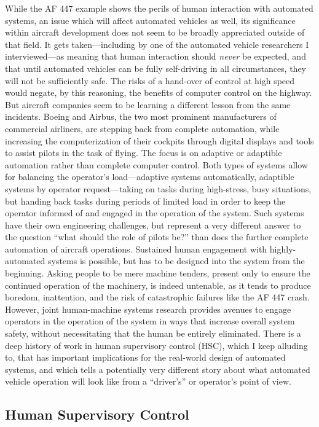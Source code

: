 While the AF 447 example shows the
perils of human interaction with automated systems, an issue which will
affect automated vehicles as well, its significance
within aircraft development does not seem to be broadly appreciated
outside of that field. It gets taken---including by one of the
automated vehicle researchers I interviewed---as meaning that human
interaction should \emph{never} be expected, and that until automated
vehicles can be fully self-driving in all circumstances, they will not
be sufficiently safe. The risks of a hand-over of control at high
speed would negate, by this reasoning, the benefits of computer
control on the highway. But aircraft companies seem to be learning a
different lesson from the same incidents. Boeing and Airbus, the two
most prominent manufacturers of commercial airliners, are stepping
back from complete automation, while increasing the computerization of
their cockpits through digital displays and tools to assist pilots in
the task of flying\cite{???}. The focus is on adaptive or adaptible automation
rather than complete computer control. Both types of systems allow for
balancing the operator's load---adaptive systems automatically,
adaptible systems by operator request---taking on tasks during
high-stress, busy situations, but handing back tasks during periods of
limited load in order to keep the operator informed of and engaged in
the operation of the system\cite{???}. Such systems have their own
engineering challenges, but represent a very different answer to the
question ``what should the role of pilots be?'' than does the further
complete automation of aircraft operations. Sustained human engagement
with highly-automated systems is possible, but has to be designed into
the system from the beginning. Asking people to be mere machine
tenders, present only to ensure the continued operation of the
machinery, is indeed untenable, as it tends to produce boredom,
inattention, and the risk of catastrophic failures like the AF 447
crash. However, joint human-machine systems research provides avenues
to engage operators in the operation of the system in ways that
increase overall system safety, without necessitating that the human
be entirely eliminated. There is a deep history of
work in human supervisory control (HSC), which I keep alluding to,
that has important implications 
for the real-world design of automated systems, and which tells a
potentially very different story about what automated vehicle
operation will look like from a ``driver's'' or operator's point of view.

\subsection{Human Supervisory Control}

